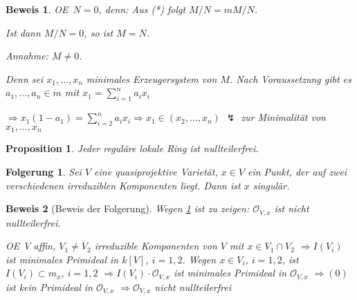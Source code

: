 \documentclass[a4paper, 12pt, numbers=noendperiod, chapterprefix=true]{scrbook}
\theoremstyle{break}
\newtheorem{Prop}[Def]{Proposition}
\newtheorem{Folg}[Def]{Folgerung}
\theoremstyle{nonumberbreak}
\newtheorem{Bew}{Beweis}
\theoremstyle{nonumberplain}
\newcommand{\Sum}{\sum\limits}
\newcommand{\calO}{\mathcal{O}}
\renewcommand{\OE}{O\!\!E~}
\begin{document}
\begin{Bew}
\OE $N=0$, denn: Aus (*) folgt $M/N=mM/N$.

Ist dann $M/N=0$, so ist $M=N$.

\emph{Annahme:} $M\ne0$.

Denn sei $x_1,\ldots ,x_n$ minimales Erzeugersystem von $M$. Nach Voraussetzung gibt es $a_1,\ldots ,a_n\in m$ mit $x_1=\Sum_{i=1}^na_ix_i$

$\Rightarrow x_1(1-a_1)=\Sum_{i=2}^na_ix_i \Rightarrow x_1\in (x_2,\ldots ,x_n)$ $\lightning$ zur Minimalit\"at von $x_1,\ldots ,x_n$
\end{Bew}

\begin{Prop}\label{19.6}
Jeder regul\"are lokale Ring ist nullteilerfrei.
\end{Prop}

\begin{Folg}
Sei $V$ eine quasiprojektive Variet\"at, $x\in V$ ein Punkt, der auf zwei verschiedenen irreduziblen Komponenten liegt. Dann ist $x$ singul\"ar.
\end{Folg}

\begin{Bew}[Beweis der Folgerung]
Wegen \ref{19.6} ist zu zeigen: $\calO_{V,x}$ ist nicht nullteilerfrei.

\OE $V$ affin, $V_1\ne V_2$ irreduzible Komponenten von $V$ mit $x\in V_1\cap V_2$ $\Rightarrow I(V_i)$ ist minimales Primideal in $k[V]$, $i=1,2$. Wegen $x\in V_i$, $i=1,2$, ist $I(V_i)\subset m_x$, $i=1,2$ $\Rightarrow I(V_i)\cdot \calO_{V,x}$ ist minimales Primideal in $\calO_{V,x}$ $\Rightarrow (0)$ ist kein Primideal in $\calO_{V,x}$ $\Rightarrow \calO_{V,x}$ nicht nullteilerfrei
\end{Bew}
\end{document}
